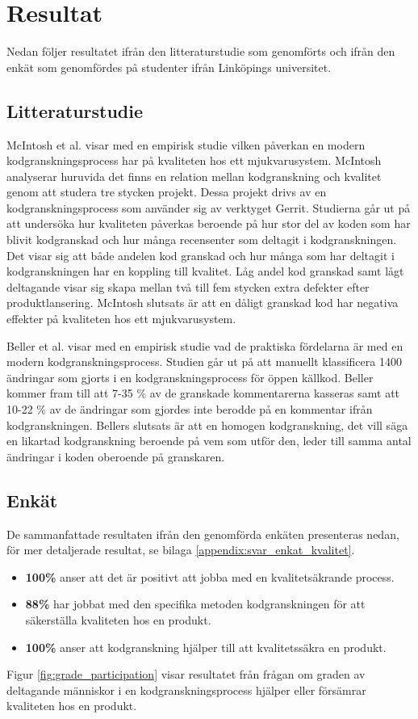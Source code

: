 \section{Resultat}
\label{sec:results-wallstrom}
Nedan följer resultatet ifrån den litteraturstudie som genomförts och ifrån den enkät som genomfördes på studenter ifrån Linköpings universitet. 

\subsection{Litteraturstudie}
McIntosh et al. \cite{mcintosh2014impact} visar med en empirisk studie vilken påverkan en modern kodgranskningsprocess har på kvaliteten hos ett mjukvarusystem. McIntosh analyserar huruvida det finns en relation mellan kodgranskning och kvalitet genom att studera tre stycken projekt. Dessa projekt drivs av en kodgranskningsprocess som använder sig av verktyget Gerrit. Studierna går ut på att undersöka hur kvaliteten påverkas beroende på hur stor del av koden som har blivit kodgranskad och hur många recensenter som deltagit i kodgranskningen. Det visar sig att både andelen kod granskad och hur många som har deltagit i kodgranskningen har en koppling till kvalitet. Låg andel kod granskad samt lågt deltagande visar sig skapa mellan två till fem stycken extra defekter efter produktlansering. McIntosh slutsats är att en dåligt granskad kod har negativa effekter på kvaliteten hos ett mjukvarusystem.

Beller et al. \cite{beller2014modern} visar med en empirisk studie vad de praktiska fördelarna är med en modern kodgranskningsprocess. Studien går ut på att manuellt klassificera 1400 ändringar som gjorts i en kodgranskningsprocess för öppen källkod. Beller kommer fram till att 7-35 \% av de granskade kommentarerna kasseras samt att 10-22 \% av de ändringar som gjordes inte berodde på en kommentar ifrån kodgranskningen. Bellers slutsats är att en homogen kodgranskning, det vill säga en likartad kodgranskning beroende på vem som utför den, leder till samma antal ändringar i koden oberoende på granskaren.

\subsection{Enkät}
De sammanfattade resultaten ifrån den genomförda enkäten presenteras nedan, för mer detaljerade resultat, se bilaga \ref{appendix:svar_enkat_kvalitet}.
\begin{itemize}
	\item \textbf{100\%} anser att det är positivt att jobba med en kvalitetsäkrande process.
	\item \textbf{88\%} har jobbat med den specifika metoden kodgranskningen för att säkerställa kvaliteten hos en produkt.
	\item \textbf{100\%} anser att kodgranskning hjälper till att kvalitetssäkra en produkt.
\end{itemize}
Figur \ref{fig:grade_participation} visar resultatet från frågan om graden av deltagande människor i en kodgranskningsprocess hjälper eller försämrar kvaliteten hos en produkt.

